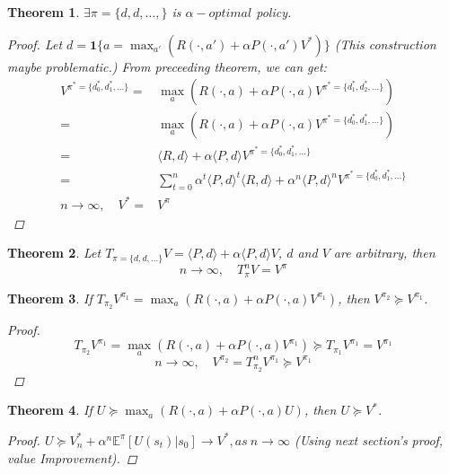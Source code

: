 \documentclass[a4paper]{article}
\newtheorem{thm}{Theorem}[section]
\numberwithin{figure}{section}
\numberwithin{equation}{section}
\begin{document}
\begin{thm}
    $ \exists \pi = \{ d, d, \ldots, \} $ is $ \alpha-optimal $ policy. 
    \begin{proof}
        Let $ d = \mathbf{1} \{ a = \max_{a'} (R(\cdot, a') + \alpha P(\cdot, a')V^*) \}$ 
        (This construction maybe problematic.)
        From preceeding theorem, we can get:
        \begin{align*}
            V^{\pi^* = \{ d^*_0, d^*_1, \ldots \}}
            =& \max_a (R(\cdot, a) + \alpha P(\cdot, a) V^{\pi^* = \{ d^*_1, d^*_2, \ldots \}} )\\
            =& \max_a (R(\cdot, a) + \alpha P(\cdot, a) V^{\pi^* = \{ d^*_0, d^*_1, \ldots \}} ) \\
            =& \langle R, d \rangle + \alpha \langle P, d \rangle V^{\pi^* = \{ d^*_0, d^*_1, \ldots \}} \\
            =& \sum^{n}_{t=0} \alpha^t \langle P, d \rangle^t \langle R, d \rangle
            + \alpha^n \langle P, d \rangle^n V^{\pi^* = \{ d^*_0, d^*_1, \ldots \}} \\
            n \rightarrow \infty,\quad V^* =& V^\pi
        \end{align*}
    \end{proof}
\end{thm}

\begin{thm}
    Let $ T_{\pi= \{ d, d, \ldots \} } V = \langle P, d \rangle + \alpha \langle P, d \rangle V $, 
    $ d $ and $ V $ are arbitrary, then
    \[
        n \rightarrow \infty, \quad T^n_{\pi} V = V^{\pi}
    \]
\end{thm}

\begin{thm}
    If $ T_{\pi_2} V^{\pi_1} = \max_a (R(\cdot, a) + \alpha P(\cdot, a) V^{\pi_1}) $, then $ V^{\pi_2} \succeq V^{\pi_1} $.
    \begin{proof}
        \[
             T_{\pi_2} V^{\pi_1} = \max_a (R(\cdot, a) + \alpha P(\cdot, a) V^{\pi_1}) 
            \succeq T_{\pi_1} V^{\pi_1} = V^{\pi_1}
        \]
        \[
            n \rightarrow \infty, \quad V^{\pi_2} = T^n_{\pi_2} V^{\pi_1} \succeq V^{\pi_1}
        \]
    \end{proof}
\end{thm}

\begin{thm}
    If $ U \succeq \max_a (R(\cdot, a) + \alpha P(\cdot, a) U) $, then $ U \succeq V^* $.
    \begin{proof}
        $ U \succeq V^*_n + \alpha^n \mathbb{E}^\pi [U(s_t) | s_0] \rightarrow V^*, as\ n \rightarrow \infty $ 
        (Using next section's proof, value Improvement).
    \end{proof}
\end{thm}
\end{document}

